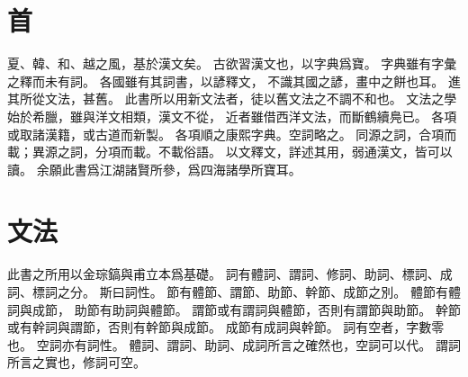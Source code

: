\chapter*{首}
夏、韓、和、越之風，基於漢文矣。
古欲習漢文也，以字典爲寶。
字典雖有字彙之釋而未有詞。
各國雖有其詞書，以諺釋文，
不識其國之諺，畫中之餅也耳。
進其所從文法，甚舊。
此書所以用新文法者，徒以舊文法之不調不和也。
文法之學始於希臘，雖與洋文相類，漢文不從，
近者雖借西洋文法，而斷鶴續鳧已\parencite{Ahn:2012}。
各項或取諸漢籍，或古道而新製。
各項順之康熙字典。空詞略之。
同源之詞，合項而載；異源之詞，分項而載。不載俗語。
以文釋文，詳述其用，弱通漢文，皆可以讀。
余願此書爲江湖諸賢所參，爲四海諸學所寶耳。
\chapter*{文法}
此書之所用以金琮鎬與甫立本爲基礎。
詞有體詞、謂詞、修詞、助詞、標詞、成詞、標詞之分\parencites[43-4]{Pulleyblank:2005}[2-35]{Kim:2019}。
斯曰詞性。
節有體節、謂節、助節、幹節、成節之別\parencite[15]{Kim:2019}。
體節有體詞與成節，
助節有助詞與體節。
謂節或有謂詞與體節，否則有謂節與助節。
幹節或有幹詞與謂節，否則有幹節與成節。
成節有成詞與幹節。
詞有空者，字數零也\parencite[2]{Kim:2019}。
空詞亦有詞性。
體詞、謂詞、助詞、成詞所言之確然也，空詞可以代。
謂詞所言之實也，修詞可空。
